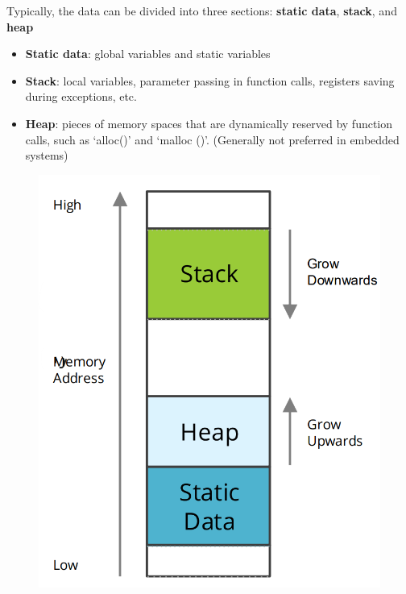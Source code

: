Typically, the data can be divided into three
sections: \textbf{static data}, \textbf{stack}, and \textbf{heap}

 \begin{minipage}{\linewidth}
      \centering
      \begin{minipage}{0.40\linewidth}
          \begin{itemize}
            \item \textbf{Static data}: global variables and static variables
            \item \textbf{Stack}: local variables, parameter passing in function calls, registers saving during exceptions, etc.
            \item \textbf{Heap}: pieces of memory spaces that are dynamically reserved by function calls, such as ‘alloc()’ and ‘malloc ()’. (Generally not preferred in embedded systems)
        \end{itemize}
      \end{minipage}
      \hspace{0.05\linewidth}
      \begin{minipage}{0.35\linewidth}
          \begin{figure}[H]
                \centering
                \includegraphics[width=1\linewidth]{img/image33.png}
          \end{figure}
      \end{minipage}
  \end{minipage}


